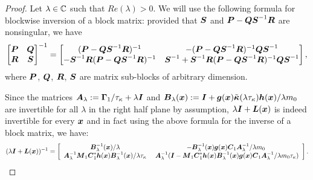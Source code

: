 \begin{proof}
Let $\lambda \in \mathbb{C}$ such that $Re(\lambda) > 0$.  We will use the following formula for blockwise inversion of a block matrix: provided that $\boldsymbol{S}$ and $\boldsymbol{P}-\boldsymbol{Q}\boldsymbol{S}^{-1} \boldsymbol{R}$ are nonsingular, we have
\begin{equation}
\begin{bmatrix}
       \boldsymbol{P} & \boldsymbol{Q}  \\ 
       \boldsymbol{R} & \boldsymbol{S}  \\
     \end{bmatrix}^{-1} = \begin{bmatrix}
       (\boldsymbol{P}-\boldsymbol{Q}\boldsymbol{S}^{-1}\boldsymbol{R})^{-1} & -(\boldsymbol{P}-\boldsymbol{Q}\boldsymbol{S}^{-1}\boldsymbol{R})^{-1} \boldsymbol{Q} \boldsymbol{S}^{-1}  \\ 
       -\boldsymbol{S}^{-1}\boldsymbol{R}(\boldsymbol{P}-\boldsymbol{Q}\boldsymbol{S}^{-1}\boldsymbol{R})^{-1} & \boldsymbol{S}^{-1} + \boldsymbol{S}^{-1}\boldsymbol{R}(\boldsymbol{P}-\boldsymbol{Q}\boldsymbol{S}^{-1}\boldsymbol{R})^{-1} \boldsymbol{Q} \boldsymbol{S}^{-1}\\
     \end{bmatrix} ,\end{equation}
where $\boldsymbol{P}$, $\boldsymbol{Q}$, $\boldsymbol{R}$, $\boldsymbol{S}$ are matrix sub-blocks of arbitrary dimension. 

Since the matrices $\boldsymbol{A}_{\lambda} := \boldsymbol{\Gamma}_1/\tau_{\kappa} + \lambda \boldsymbol{I}$ and $\boldsymbol{B}_{\lambda}(\boldsymbol{x}) := \boldsymbol{I} + \boldsymbol{g}(\boldsymbol{x}) \tilde{\boldsymbol{\kappa}}(\lambda \tau_{\kappa}) \boldsymbol{h}(\boldsymbol{x})/\lambda m_0$ are invertible for all $\lambda$ in the right half plane by assumption, $\lambda \boldsymbol{I} + \boldsymbol{L}(\boldsymbol{x})$ is indeed invertible for every $\boldsymbol{x}$ and in fact using the above formula for the inverse of a block matrix, we have:
\begin{equation}
(\lambda \vecc{I} + \vecc{L}(\vecc{x}))^{-1} = \left[ \begin{array}{cc}
\vecc{B}_{\lambda}^{-1}(\vecc{x})/\lambda & -\vecc{B}_{\lambda}^{-1}(\vecc{x}) \vecc{g}(\vecc{x}) \vecc{C}_1 \vecc{A}_{\lambda}^{-1}/\lambda m_0   \\
\vecc{A}_{\lambda}^{-1} \vecc{M}_1 \vecc{C}_1^* \vecc{h}(\vecc{x}) \vecc{B}_{\lambda}^{-1}(\vecc{x})/\lambda \tau_{\kappa} & \ \vecc{A}_{\lambda}^{-1} (\vecc{I} - \vecc{M}_1 \vecc{C}_1^* \vecc{h}(\vecc{x})\vecc{B}_{\lambda}^{-1}(\vecc{x}) \vecc{g}(\vecc{x}) \vecc{C}_1 \vecc{A}_{\lambda}^{-1}/\lambda m_0 \tau_{\kappa}) \end{array} \right].
\end{equation}





\end{proof}
